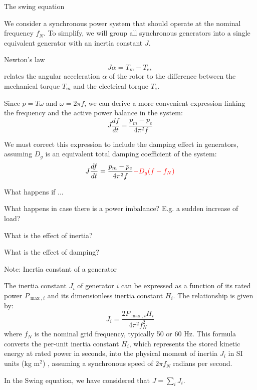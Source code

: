 \begin{frame}[allowframebreaks]{The swing equation}

    We consider a synchronous power system that should operate at the nominal frequency $f_N$.
    To simplify, we will group all synchronous generators into a single equivalent generator with an
    inertia constant $J$. %

    Newton's law $$J\alpha = T_m-T_e,$$ 
    relates the angular acceleration $\alpha$ of the rotor to the difference between the mechanical torque $T_m$ and the electrical torque $T_e$.
    
    Since $p = T\omega$ and $\omega = 2\pi f$, we can derive a more convenient expression linking the frequency and the active power balance in the system:
    $$J \frac{df}{dt} = \frac{p_m - p_e}{4\pi^2 f}$$

    We must correct this expression to include the damping effect in generators, assuming $D_g$ is an equivalent total damping coefficient of the system: 
    $$J \frac{df}{dt} = \frac{p_m - p_e}{4\pi^2 f} \color{red}{- D_g (f-f_N)}$$

\end{frame}
\begin{frame}{What happens if ...}

    \begin{block}{What happens in case there is a power imbalance?}
    E.g. a sudden increase of load? \vspace*{1cm}
    \end{block}
    
    \begin{block}{What is the effect of inertia?}
      \vspace*{1cm}
    \end{block}

    \begin{block}{What is the effect of damping?}
      \vspace*{1cm}
    \end{block}

\end{frame}

\begin{frame}{Note: Inertia constant of a generator}

  The inertia constant \( J_i \) of generator \( i \) can be expressed as a function of its rated power \( P_{\max,i} \) and its dimensionless inertia constant \( H_i \). The relationship is given by:
\[
J_i = \frac{2 P_{\max,i} H_i}{4 \pi^2 f_N^2}
\]
where \( f_N \) is the nominal grid frequency, typically 50 or 60 Hz. 
This formula converts the per-unit inertia constant \( H_i \), which represents the stored kinetic energy at rated power in seconds, into the physical moment of inertia \( J_i \) in SI units (kg m$^2$) , assuming a synchronous speed of \( 2\pi f_N \) radians per second.

In the Swing equation, we have considered that $J = \sum_i J_i$.

\end{frame}

